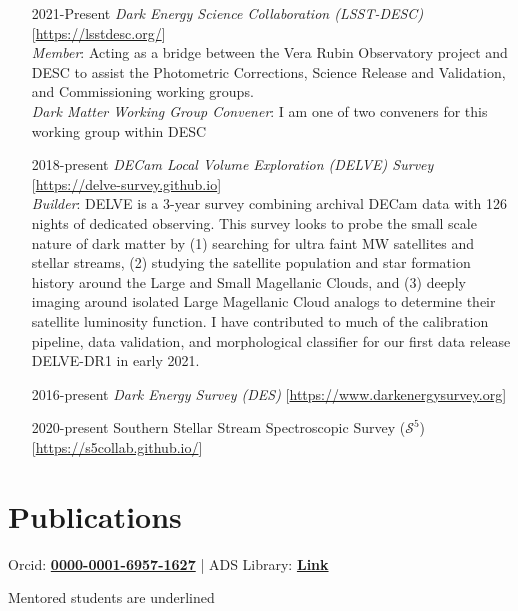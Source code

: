 \documentclass[11pt,letterpaper, sans]{moderncv}        %
\let\oldhref\href
\renewcommand{\href}[2]{\oldhref{#1}{\bfseries#2}}
\begin{document}
\begin{itemize}[itemsep=1pt, leftmargin=65pt]
\begin{itemize}
    \end{itemize}
    \item [2021-Present] \emph{Dark Energy Science Collaboration (LSST-DESC)} [\url{https://lsstdesc.org/}]\\
    \emph{Member}: Acting as a bridge between the Vera Rubin Observatory project and DESC to assist the Photometric Corrections, Science Release and Validation, and Commissioning working groups. \\
    \emph{Dark Matter Working Group Convener}: I am one of two conveners for this working group within DESC
    \item [2018-present] \emph{DECam Local Volume Exploration (DELVE) Survey} [\url{https://delve-survey.github.io}]\\
    \emph{Builder}: DELVE is a 3-year survey combining archival DECam data with 126 nights of dedicated observing. This survey looks to probe the small scale nature of dark matter by (1) searching for ultra faint MW satellites and stellar streams, (2) studying the satellite population and star formation history around the Large and Small Magellanic Clouds, and (3) deeply imaging around isolated Large Magellanic Cloud analogs to determine their satellite luminosity function. I have contributed to much of the calibration pipeline, data validation, and morphological classifier for our first data release DELVE-DR1 in early 2021. 
    
    \item [2016-present] \emph{Dark Energy Survey (DES)} [\url{https://www.darkenergysurvey.org}]\\
    \item [2020-present] Southern Stellar Stream Spectroscopic Survey ($\mathcal{S}^5$) [\url{https://s5collab.github.io/}]\\
\end{itemize}
\vspace*{-4mm}

\section{Publications}
\begin{center}
Orcid: \href{https://orcid.org/0000-0001-6957-1627}{0000-0001-6957-1627} | ADS Library: \href{https://ui.adsabs.harvard.edu/user/libraries/rBhHJF5MTWqIJuR0n-PNKA}{Link} 

Mentored students are underlined
\end{center}
%

\newpage
\end{document}
